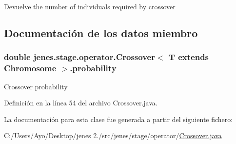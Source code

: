 \begin{DoxyReturn}{Devuelve}
the number of individuals required by crossover 
\end{DoxyReturn}


\subsection{Documentación de los datos miembro}
\hypertarget{classjenes_1_1stage_1_1operator_1_1_crossover_3_01_t_01extends_01_chromosome_01_4_a2b4aec7312a223ba84862f7848b14542}{
\subsubsection[{probability}]{\setlength{\rightskip}{0pt plus 5cm}double jenes.\-stage.\-operator.\-Crossover$<$ T extends Chromosome $>$.probability\hspace{0.3cm}{\ttfamily [protected]}}}\label{classjenes_1_1stage_1_1operator_1_1_crossover_3_01_t_01extends_01_chromosome_01_4_a2b4aec7312a223ba84862f7848b14542}
Crossover probability 

Definición en la línea 54 del archivo Crossover.\-java.



La documentación para esta clase fue generada a partir del siguiente fichero\-:\begin{DoxyCompactItemize}
\item 
C\-:/\-Users/\-Ayo/\-Desktop/jenes 2./src/jenes/stage/operator/\hyperlink{_crossover_8java}{Crossover.\-java}\end{DoxyCompactItemize}
